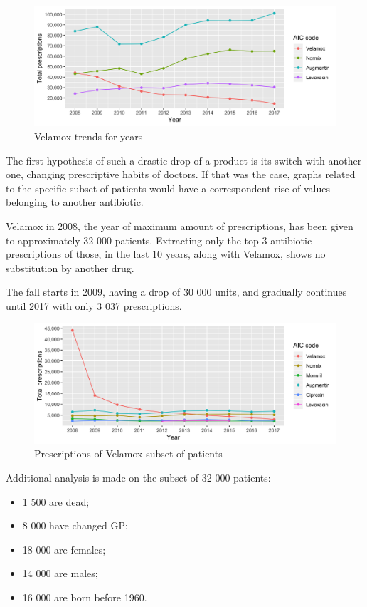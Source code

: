 \begin{figure}[h]
	\centering
	\includegraphics[scale=0.3]{../plots/aic_4-year.png}
	\caption{\small Velamox trends for years}
\end{figure}

The first hypothesis of such a drastic drop of a product is its switch with another one, changing prescriptive habits of doctors. If that was the case, graphs related to the specific subset of patients would have a correspondent rise of values belonging to another antibiotic.

Velamox in 2008, the year of maximum amount of prescriptions, has been given to approximately 32 000 patients. Extracting only the top 3 antibiotic prescriptions of those, in the last 10 years, along with Velamox, shows no substitution by another drug.

The fall starts in 2009, having a drop of 30 000 units, and gradually continues until 2017 with only 3 037 prescriptions.

\begin{figure}[h]
	\centering
	\includegraphics[scale=0.3]{../plots/top_aic_subset-year.png}
	\caption{\small Prescriptions of Velamox subset of patients}
\end{figure}

Additional analysis is made on the subset of 32 000 patients:
\begin{itemize}
	\item 1 500 are dead;
	\item 8 000 have changed GP;
	\item 18 000 are females;
	\item 14 000 are males;
	\item 16 000 are born before 1960.
\end{itemize}

